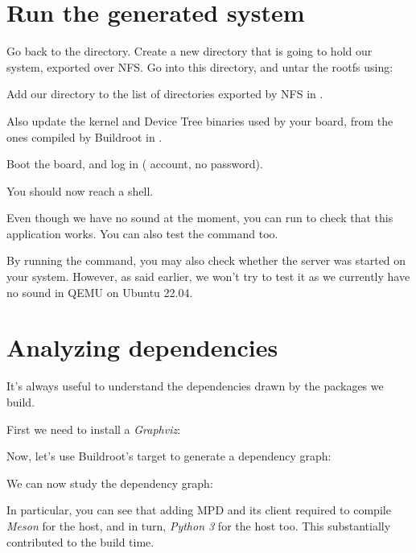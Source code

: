 \section{Run the generated system}

Go back to the  directory. Create
a new  directory that is going to hold our system,
exported over NFS. Go into this directory, and untar the rootfs using:


Add our  directory to the list of directories exported
by NFS in .

Also update the kernel and Device Tree binaries used by your board,
from the ones compiled by Buildroot in .

Boot the board, and log in ( account, no password).

You should now reach a shell.

Even though we have no sound at the moment, you can run 
to check that this application works. You can also test the 
command too.

By running the  command, you may also check whether the 
server was started on your system. However, as said earlier, we won't try
to test it as we currently have no sound in QEMU on Ubuntu 22.04.

\section{Analyzing dependencies}

It's always useful to understand the dependencies drawn by the
packages we build.

First we need to install a {\em Graphviz}:


Now, let's use Buildroot's target to generate a
dependency graph:


We can now study the dependency graph:


In particular, you can see that adding MPD and its client
required to compile {\em Meson} for the host, and in turn,
{\em Python 3} for the host too. This substantially contributed to the
build time.


